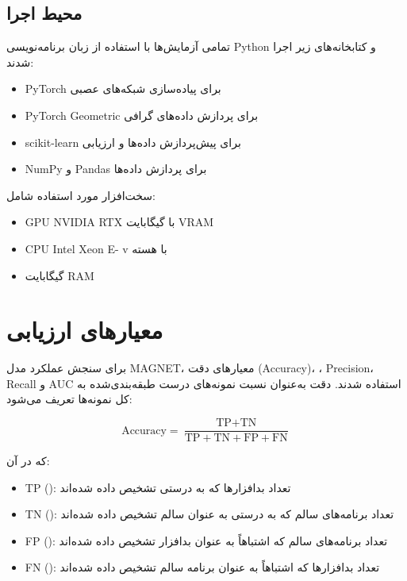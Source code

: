 \subsection{محیط اجرا}
تمامی آزمایش‌ها با استفاده از زبان برنامه‌نویسی Python  و کتابخانه‌های زیر اجرا شدند:
\begin{itemize}
    \item PyTorch  برای پیاده‌سازی شبکه‌های عصبی
    \item PyTorch Geometric  برای پردازش داده‌های گرافی
    \item scikit-learn  برای پیش‌پردازش داده‌ها و ارزیابی
    \item NumPy  و Pandas  برای پردازش داده‌ها
\end{itemize}

سخت‌افزار مورد استفاده شامل:
\begin{itemize}
    \item GPU NVIDIA RTX  با  گیگابایت VRAM
    \item CPU Intel Xeon E- v با  هسته
    \item {} گیگابایت RAM
\end{itemize}

\section{معیارهای ارزیابی}
برای سنجش عملکرد مدل MAGNET، معیارهای دقت (Accuracy)، ، Precision، Recall و AUC استفاده شدند. دقت به‌عنوان نسبت نمونه‌های درست طبقه‌بندی‌شده به کل نمونه‌ها تعریف می‌شود:

\begin{equation}
\text{Accuracy} = \frac{\text{TP} + \text{TN}}{\text{TP} + \text{TN} + \text{FP} + \text{FN}}
\end{equation}

که در آن:
\begin{itemize}
    \item TP (): تعداد بدافزارها که به درستی تشخیص داده شده‌اند
    \item TN (): تعداد برنامه‌های سالم که به درستی به عنوان سالم تشخیص داده شده‌اند
    \item FP (): تعداد برنامه‌های سالم که اشتباهاً به عنوان بدافزار تشخیص داده شده‌اند
    \item FN (): تعداد بدافزارها که اشتباهاً به عنوان برنامه سالم تشخیص داده شده‌اند
\end{itemize}

